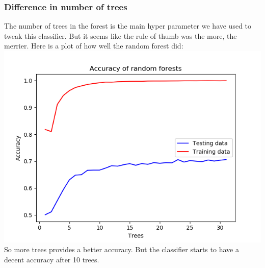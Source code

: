 \documentclass[parskip=half]{scrartcl}
\theoremstyle{definition}
\theoremstyle{remark}
\begin{document}
\subsubsection{Difference in number of trees}
The number of trees in the forest is the main hyper parameter we have used to tweak this classifier. But it seems like the rule of thumb was the more, the merrier.
Here is a plot of how well the random forest did:\\
\includegraphics[scale=.7]{images/32treesAcc}\\
So more trees provides a better accuracy. But the classifier starts to have a decent accuracy after 10 trees.
\end{document}
